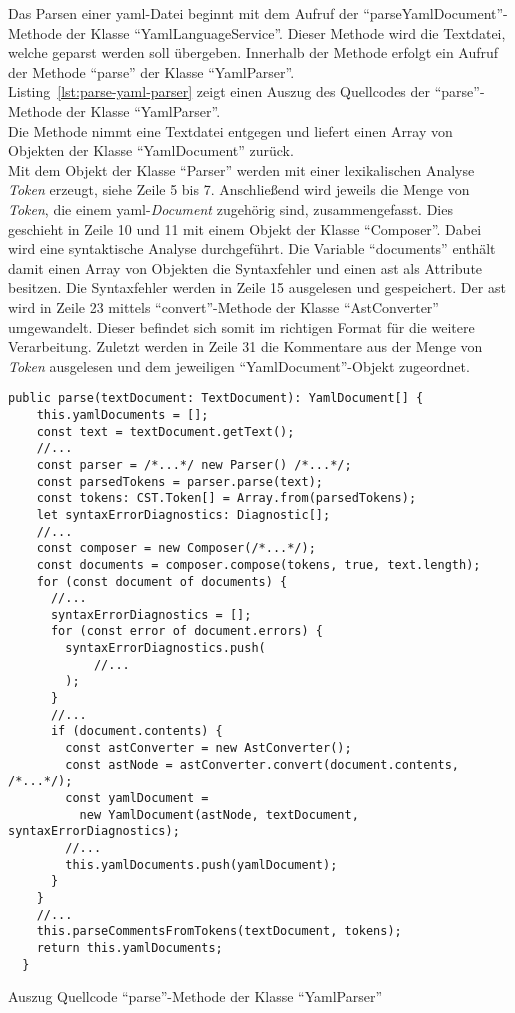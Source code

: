 Das Parsen einer \ac{yaml}-Datei beginnt mit dem Aufruf der ``parseYamlDocument''-Methode der Klasse ``YamlLanguageService''.
Dieser Methode wird die Textdatei, welche geparst werden soll übergeben. Innerhalb der Methode erfolgt ein Aufruf
der Methode ``parse'' der Klasse ``YamlParser''.
\\
Listing~\ref{lst:parse-yaml-parser} zeigt einen Auszug des Quellcodes der ``parse''-Methode der Klasse ``YamlParser''.
\\
Die Methode nimmt eine Textdatei entgegen und liefert einen Array von Objekten der Klasse ``YamlDocument'' zurück.
\\
Mit dem Objekt der Klasse ``Parser'' werden mit einer lexikalischen Analyse \textit{Token} erzeugt, siehe Zeile 5 bis 7.
Anschließend wird jeweils die Menge von \textit{Token}, die einem \ac{yaml}-\textit{Document} zugehörig sind, zusammengefasst.
Dies geschieht in Zeile 10 und 11 mit einem Objekt der Klasse ``Composer''.
Dabei wird eine syntaktische Analyse durchgeführt. Die Variable ``documents'' enthält damit einen Array
von Objekten die Syntaxfehler und einen \ac{ast} als Attribute besitzen.
Die Syntaxfehler werden in Zeile 15 ausgelesen und gespeichert.
Der \ac{ast} wird in Zeile 23 mittels ``convert''-Methode der Klasse ``AstConverter'' umgewandelt.
Dieser befindet sich somit im richtigen Format für die weitere Verarbeitung.
Zuletzt werden in Zeile 31 die Kommentare aus der Menge von \textit{Token} ausgelesen und dem jeweiligen ``YamlDocument''-Objekt zugeordnet.

\begin{listing}[htp]
  \begin{verbatim}
public parse(textDocument: TextDocument): YamlDocument[] {
    this.yamlDocuments = [];
    const text = textDocument.getText();  
    //...
    const parser = /*...*/ new Parser() /*...*/;
    const parsedTokens = parser.parse(text);
    const tokens: CST.Token[] = Array.from(parsedTokens);
    let syntaxErrorDiagnostics: Diagnostic[];
    //...  
    const composer = new Composer(/*...*/);
    const documents = composer.compose(tokens, true, text.length);
    for (const document of documents) {
      //...
      syntaxErrorDiagnostics = [];
      for (const error of document.errors) {
        syntaxErrorDiagnostics.push(
            //...
        );
      }
      //...
      if (document.contents) {
        const astConverter = new AstConverter();
        const astNode = astConverter.convert(document.contents, /*...*/);
        const yamlDocument = 
          new YamlDocument(astNode, textDocument, syntaxErrorDiagnostics);
        //...   
        this.yamlDocuments.push(yamlDocument);
      }
    }
    //...          
    this.parseCommentsFromTokens(textDocument, tokens);
    return this.yamlDocuments;
  }
      \end{verbatim}
  \caption{Auszug Quellcode ``parse''-Methode der Klasse ``YamlParser''}
  \label{lst:parse-yaml-parser}
\end{listing}

